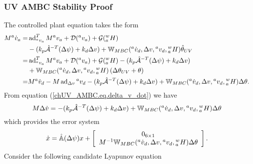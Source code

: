

\subsubsection{\acs{UV} \acs{AMBC} Stability Proof}
\label{chUV_AMBC.sec.proof_AMBC}

The controlled plant equation takes the form
%
\begin{align}
  M{^a}\dot{v}_a=
     &\operatorname{ad}_{{^a}v_a}^T M{^a}v_a+\mathcal{D}({^a}v_a)+\mathcal{G}({^w_a}H)
\nonumber \\ 
     &-(k_p\hat{\mathcal{A}}^{-T}(\Delta \psi)+k_d\Delta v)
+\mathbb{W}_{MBC}({^a}\dot{v}_d,\Delta v, {^a}v_d , {^w_a}H)\hat{\theta}_{UV}
\nonumber \\
    =&\operatorname{ad}_{{^a}v_a}^T M{^a}v_a+\mathcal{D}({^a}v_a)+\mathcal{G}({^w_a}H)
      -(k_p\hat{\mathcal{A}}^{-T}(\Delta \psi)+k_d\Delta v)
\nonumber \\
     &+\mathbb{W}_{MBC}({^a}\dot{v}_d,\Delta v, {^a}v_d ,
     {^w_a}H)\left(\Delta \theta_{UV} + \theta \right)
\nonumber \\
    =&M{^a}\dot{v}_d - M\operatorname{ad}_{\Delta v}{^a}v_d
      -(k_p\hat{\mathcal{A}}^{-T}(\Delta \psi)+k_d\Delta v)
      +\mathbb{W}_{MBC}({^a}\dot{v}_d,\Delta v, {^a}v_d ,
      {^w_a}H)\Delta \theta.
\end{align}
%
From equation (\ref{chUV_AMBC.eq.delta_v_dot}) we have
%
\begin{equation}\label{chUV_AMBC.eq.Mdelta_v_dot_adapt}
M \Delta\dot{ v} = -(k_p\hat{\mathcal{A}}^{-T}(\Delta \psi)+k_d\Delta
v) +\mathbb{W}_{MBC}({^a}\dot{v}_d,\Delta v, {^a}v_d ,
      {^w_a}H)\Delta \theta
\end{equation}
%
which provides the error system
%
\begin{equation}\label{chUV_AMBC.eq.AMBC_errorDyn}
\dot{x}=\hat{\mathbb{A}}(\Delta \psi) x +
\left[\begin{array}{c}
   0_{6\times 1}   \\ M^{-1}\mathbb{W}_{MBC}({^a}\dot{v}_d,\Delta v, {^a}v_d ,
      {^w_a}H)\Delta \theta
   \end{array} \right]. 
\end{equation}
%
Consider the following candidate Lyapunov equation
